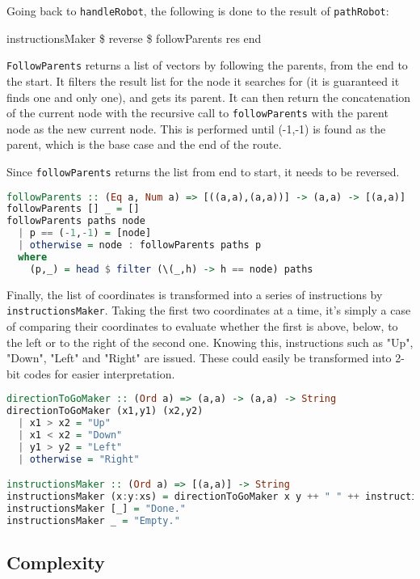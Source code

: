 Going back to \lstinline{handleRobot}, the following is done to the result of \lstinline{pathRobot}:

\begin{center}
instructionsMaker \$ reverse \$ followParents res end
\end{center}

\lstinline{FollowParents} returns a list of vectors by following the parents, from the end to the start. It filters the result list for the node it searches for (it is guaranteed it finds one and only one), and gets its parent. It can then return the concatenation of the current node with the recursive call to \lstinline{followParents} with the parent node as the new current node. This is performed until (-1,-1) is found as the parent, which is the base case and the end of the route. 
\par
Since \lstinline{followParents} returns the list from end to start, it needs to be reversed.

\begin{lstlisting}[caption={},language=haskell]
followParents :: (Eq a, Num a) => [((a,a),(a,a))] -> (a,a) -> [(a,a)]
followParents [] _ = []
followParents paths node
  | p == (-1,-1) = [node]
  | otherwise = node : followParents paths p
  where
    (p,_) = head $ filter (\(_,h) -> h == node) paths
\end{lstlisting}

Finally, the list of coordinates is transformed into a series of instructions by \lstinline{instructionsMaker}. Taking the first two coordinates at a time, it's simply a case of comparing their coordinates to evaluate whether the first is above, below, to the left or to the right of the second one. Knowing this, instructions such as "Up", "Down", "Left" and "Right" are issued. These could easily be transformed into 2-bit codes for easier interpretation.

\begin{lstlisting}[caption={},language=haskell]
directionToGoMaker :: (Ord a) => (a,a) -> (a,a) -> String
directionToGoMaker (x1,y1) (x2,y2)
  | x1 > x2 = "Up"
  | x1 < x2 = "Down"
  | y1 > y2 = "Left"
  | otherwise = "Right"

instructionsMaker :: (Ord a) => [(a,a)] -> String
instructionsMaker (x:y:xs) = directionToGoMaker x y ++ " " ++ instructionsMaker (y:xs)
instructionsMaker [_] = "Done."
instructionsMaker _ = "Empty."
\end{lstlisting}

\subsection{Complexity}

